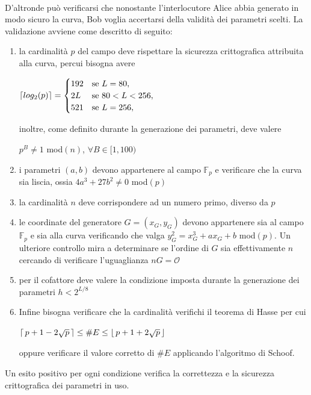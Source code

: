 \documentclass[a4paper,12pt]{tesiinfo}
\DeclarePairedDelimiter\ceil{\lceil}{\rceil}
\DeclarePairedDelimiter\floor{\lfloor}{\rfloor}
\begin{document}
\\
D'altronde pu\`o verificarsi che nonostante l'interlocutore Alice abbia generato in modo sicuro la curva, Bob voglia accertarsi della validit\`a dei parametri scelti. La validazione avviene come descritto di seguito:
\begin{enumerate}
 \item la cardinalit\`a $p$ del campo deve rispettare la sicurezza crittografica attribuita alla curva, percui bisogna avere 
 \begin{center}$
 \ceil{log_2(p)}=
 \begin{cases}
  192 & \text{se }L=80,\\
  2L & \text{se }80<L<256,\\
  521 & \text{se }L=256,\\
 \end{cases}$
 \end{center}
 inoltre, come definito durante la generazione dei parametri, deve valere \begin{center}
 $p^B \ne 1$ mod$(n)$, $\forall B\in [1, 100)$
 \end{center} 
 \item i parametri $(a, b)$ devono appartenere al campo $\mathbb{F}_p$ e verificare che la curva sia liscia, ossia $4a^3+27b^2 \ne 0$ mod$(p)$
 \item la cardinalit\`a $n$ deve corrispondere ad un numero primo, diverso da $p$
 \item le coordinate del generatore $G=(x_G, y_G)$ devono appartenere sia al campo $\mathbb{F}_p$ e sia alla curva verificando che valga $y_G^2=x_G^3+ax_G+b$ mod$(p)$. Un ulteriore controllo mira a determinare se l'ordine di $G$ sia effettivamente $n$ cercando di verificare l'uguaglianza $nG=\mathcal{O}$
 \item per il cofattore deve valere la condizione imposta durante la generazione dei parametri $h<2^{L / 8}$
 \item Infine bisogna verificare che la cardinalit\`a verifichi il teorema di Hasse per cui \begin{center}
 $\ceil{\, p+1-2\sqrt{p}\,} \leq \#E \leq \floor{\,p+1+2\sqrt{p}\,}$
 \end{center}
 oppure verificare il valore corretto di $\#E$ applicando l'algoritmo di Schoof.
\end{enumerate}
Un esito positivo per ogni condizione verifica la correttezza e la sicurezza crittografica dei parametri in uso.
%
%
%
%
%
%
%
%
%
\end{document}
